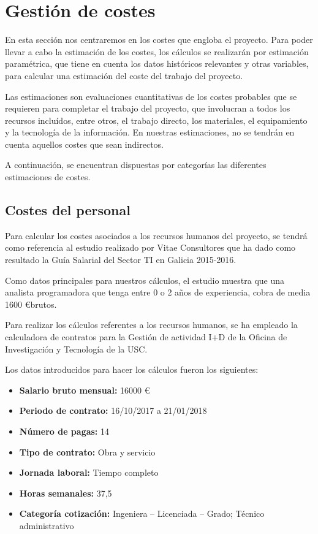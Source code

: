 
\section{Gestión de costes}

En esta sección nos centraremos en los costes que engloba el proyecto. Para poder llevar a cabo la estimación de los costes, los cálculos se realizarán por estimación paramétrica\cite{pmbok}, que tiene en cuenta los datos históricos relevantes y otras variables, para calcular una estimación del coste del trabajo del proyecto.


Las estimaciones son evaluaciones cuantitativas de los costes probables que se requieren para completar el trabajo del proyecto, que involucran a todos los recursos incluídos, entre otros, el trabajo directo, los materiales, el equipamiento y la tecnología de la información. En nuestras estimaciones, no se tendrán en cuenta aquellos costes que sean indirectos.


A continuación, se encuentran dispuestas por categorías las diferentes estimaciones de costes.


\subsection{Costes del personal}
Para calcular los costes asociados a los recursos humanos del proyecto, se tendrá como referencia al estudio realizado por Vitae Consultores que ha dado como resultado la Guía Salarial del Sector TI en Galicia 2015-2016\cite{vitae}.


Como datos principales para nuestros cálculos, el estudio muestra que una analista programadora que tenga entre 0 o 2 años de experiencia, cobra de media 1600 \euro brutos.


Para realizar los cálculos referentes a los recursos humanos, se ha empleado la calculadora de contratos para la Gestión de actividad I+D de la Oficina de Investigación y Tecnología de la USC\cite{calculadoracontratos}.


Los datos introducidos para hacer los cálculos fueron los siguientes:
\begin{itemize}
\item \textbf{Salario bruto mensual:} 16000 \euro
\item \textbf{Periodo de contrato:} 16/10/2017 a 21/01/2018
\item \textbf{Número de pagas:} 14
\item \textbf{Tipo de contrato:} Obra y servicio
\item \textbf{Jornada laboral:} Tiempo completo
\item \textbf{Horas semanales:} 37,5
\item \textbf{Categoría cotización:} Ingeniera – Licenciada – Grado; Técnico administrativo
\end{itemize}


